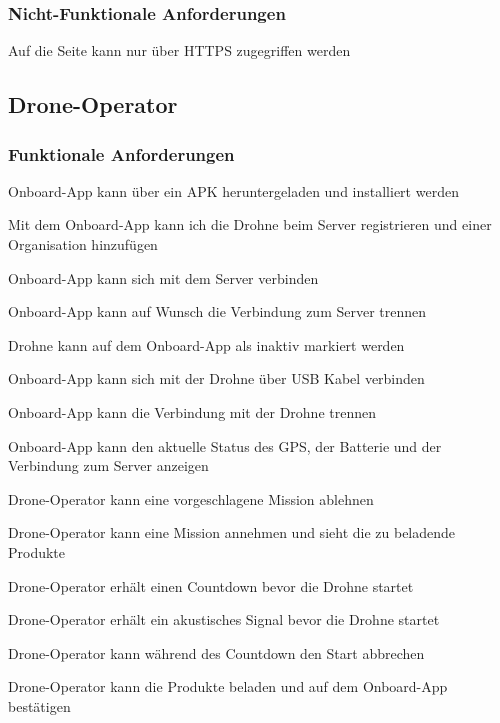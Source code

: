 \subsubsection{Nicht-Funktionale Anforderungen}
\begin{todolist}
	\item Auf die Seite kann nur über HTTPS zugegriffen werden
\end{todolist}

\subsection{Drone-Operator}
\subsubsection{Funktionale Anforderungen}
\begin{todolist}
	\item Onboard-App kann über ein APK heruntergeladen und installiert werden
	\item[\done] Mit dem Onboard-App kann ich die Drohne beim Server registrieren und einer Organisation hinzufügen
	\item[\done] Onboard-App kann sich mit dem Server verbinden
	\item Onboard-App kann auf Wunsch die Verbindung zum Server trennen
	\item Drohne kann auf dem Onboard-App als inaktiv markiert werden
	\item[\done] Onboard-App kann sich mit der Drohne über USB Kabel verbinden
	\item[\done] Onboard-App kann die Verbindung mit der Drohne trennen
	\item Onboard-App kann den aktuelle Status des GPS, der Batterie und der Verbindung zum Server anzeigen
	\item Drone-Operator kann eine vorgeschlagene Mission ablehnen
	\item Drone-Operator kann eine Mission annehmen und sieht die zu beladende Produkte
	\item Drone-Operator erhält einen Countdown bevor die Drohne startet
	\item Drone-Operator erhält ein akustisches Signal bevor die Drohne startet
	\item Drone-Operator kann während des Countdown den Start abbrechen
	\item Drone-Operator kann die Produkte beladen und auf dem Onboard-App bestätigen
\end{todolist}

